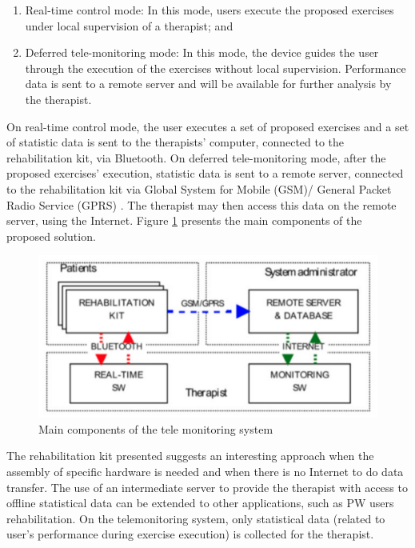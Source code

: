 \begin{enumerate}[label=(\alph*)]
\item Real-time control mode: In this mode, users execute the proposed exercises under local supervision of a therapist; and
\item Deferred tele-monitoring mode: In this mode, the device guides the user through the execution of the exercises without local supervision. Performance data is sent to a remote server and will be available for further analysis by the therapist.
\end{enumerate}

On real-time control mode, the user executes a set of proposed exercises and a set of statistic data is sent to the therapists' computer, connected to the rehabilitation kit, via Bluetooth. On deferred tele-monitoring mode, after the proposed exercises' execution, statistic data is sent to a remote server, connected to the rehabilitation kit via Global System for Mobile  (GSM)/ General Packet Radio Service (GPRS) \cite{pani2014}. The therapist may then access this data on the remote server, using the Internet. Figure \ref{fig:pani2014-components} presents the main components of the proposed solution.

\begin{figure}[!hbt]
\begin{center}
\includegraphics[width=0.7 \textwidth]{img/cap3/pani2014-components}
\caption{Main components of the tele monitoring system \cite{pani2014}}
\label{fig:pani2014-components}
\end{center}
\end{figure}

The rehabilitation kit presented suggests an interesting approach when the assembly of specific hardware is needed and when there is no Internet to do data transfer. The use of an intermediate server to provide the therapist with access to offline statistical data can be extended to other applications, such as PW users rehabilitation. On the telemonitoring system, only statistical data (related to user's performance during exercise execution) is collected for the therapist. 

